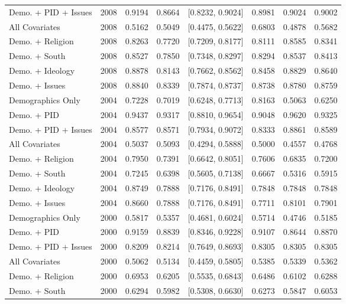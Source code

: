 \begin{longtable}{lrrrlrrr}
  Demo. + PID + Issues & 2008 & 0.9194 & 0.8664 & [0.8232, 0.9024] & 0.8981 & 0.9024 & 0.9002 \\ 
  All Covariates & 2008 & 0.5162 & 0.5049 & [0.4475, 0.5622] & 0.6803 & 0.4878 & 0.5682 \\ 
  Demo. + Religion & 2008 & 0.8263 & 0.7720 & [0.7209, 0.8177] & 0.8111 & 0.8585 & 0.8341 \\ 
  Demo. + South & 2008 & 0.8527 & 0.7850 & [0.7348, 0.8297] & 0.8294 & 0.8537 & 0.8413 \\ 
  Demo. + Ideology & 2008 & 0.8878 & 0.8143 & [0.7662, 0.8562] & 0.8458 & 0.8829 & 0.8640 \\ 
  Demo. + Issues & 2008 & 0.8840 & 0.8339 & [0.7874, 0.8737] & 0.8738 & 0.8780 & 0.8759 \\ 
  Demographics Only & 2004 & 0.7228 & 0.7019 & [0.6248, 0.7713] & 0.8163 & 0.5063 & 0.6250 \\ 
  Demo. + PID & 2004 & 0.9437 & 0.9317 & [0.8810, 0.9654] & 0.9048 & 0.9620 & 0.9325 \\ 
  Demo. + PID + Issues & 2004 & 0.8577 & 0.8571 & [0.7934, 0.9072] & 0.8333 & 0.8861 & 0.8589 \\ 
  All Covariates & 2004 & 0.5037 & 0.5093 & [0.4294, 0.5888] & 0.5000 & 0.4557 & 0.4768 \\ 
  Demo. + Religion & 2004 & 0.7950 & 0.7391 & [0.6642, 0.8051] & 0.7606 & 0.6835 & 0.7200 \\ 
  Demo. + South & 2004 & 0.7245 & 0.6398 & [0.5605, 0.7138] & 0.6667 & 0.5316 & 0.5915 \\ 
  Demo. + Ideology & 2004 & 0.8749 & 0.7888 & [0.7176, 0.8491] & 0.7848 & 0.7848 & 0.7848 \\ 
  Demo. + Issues & 2004 & 0.8660 & 0.7888 & [0.7176, 0.8491] & 0.7711 & 0.8101 & 0.7901 \\ 
  Demographics Only & 2000 & 0.5817 & 0.5357 & [0.4681, 0.6024] & 0.5714 & 0.4746 & 0.5185 \\ 
  Demo. + PID & 2000 & 0.9159 & 0.8839 & [0.8346, 0.9228] & 0.9107 & 0.8644 & 0.8870 \\ 
  Demo. + PID + Issues & 2000 & 0.8209 & 0.8214 & [0.7649, 0.8693] & 0.8305 & 0.8305 & 0.8305 \\ 
  All Covariates & 2000 & 0.5062 & 0.5134 & [0.4459, 0.5805] & 0.5385 & 0.5339 & 0.5362 \\ 
  Demo. + Religion & 2000 & 0.6953 & 0.6205 & [0.5535, 0.6843] & 0.6486 & 0.6102 & 0.6288 \\ 
  Demo. + South & 2000 & 0.6294 & 0.5982 & [0.5308, 0.6630] & 0.6273 & 0.5847 & 0.6053 \\ 

\end{longtable}
